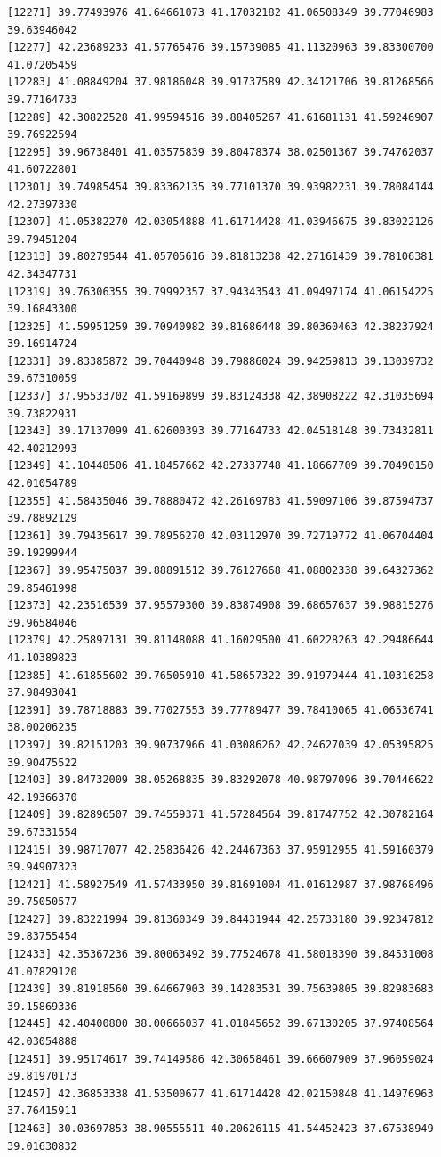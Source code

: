 \documentclass[
  letterpaper,
  DIV=11,
  numbers=noendperiod]{scrartcl}
\begin{document}
\begin{verbatim}
[12271] 39.77493976 41.64661073 41.17032182 41.06508349 39.77046983 39.63946042
[12277] 42.23689233 41.57765476 39.15739085 41.11320963 39.83300700 41.07205459
[12283] 41.08849204 37.98186048 39.91737589 42.34121706 39.81268566 39.77164733
[12289] 42.30822528 41.99594516 39.88405267 41.61681131 41.59246907 39.76922594
[12295] 39.96738401 41.03575839 39.80478374 38.02501367 39.74762037 41.60722801
[12301] 39.74985454 39.83362135 39.77101370 39.93982231 39.78084144 42.27397330
[12307] 41.05382270 42.03054888 41.61714428 41.03946675 39.83022126 39.79451204
[12313] 39.80279544 41.05705616 39.81813238 42.27161439 39.78106381 42.34347731
[12319] 39.76306355 39.79992357 37.94343543 41.09497174 41.06154225 39.16843300
[12325] 41.59951259 39.70940982 39.81686448 39.80360463 42.38237924 39.16914724
[12331] 39.83385872 39.70440948 39.79886024 39.94259813 39.13039732 39.67310059
[12337] 37.95533702 41.59169899 39.83124338 42.38908222 42.31035694 39.73822931
[12343] 39.17137099 41.62600393 39.77164733 42.04518148 39.73432811 42.40212993
[12349] 41.10448506 41.18457662 42.27337748 41.18667709 39.70490150 42.01054789
[12355] 41.58435046 39.78880472 42.26169783 41.59097106 39.87594737 39.78892129
[12361] 39.79435617 39.78956270 42.03112970 39.72719772 41.06704404 39.19299944
[12367] 39.95475037 39.88891512 39.76127668 41.08802338 39.64327362 39.85461998
[12373] 42.23516539 37.95579300 39.83874908 39.68657637 39.98815276 39.96584046
[12379] 42.25897131 39.81148088 41.16029500 41.60228263 42.29486644 41.10389823
[12385] 41.61855602 39.76505910 41.58657322 39.91979444 41.10316258 37.98493041
[12391] 39.78718883 39.77027553 39.77789477 39.78410065 41.06536741 38.00206235
[12397] 39.82151203 39.90737966 41.03086262 42.24627039 42.05395825 39.90475522
[12403] 39.84732009 38.05268835 39.83292078 40.98797096 39.70446622 42.19366370
[12409] 39.82896507 39.74559371 41.57284564 39.81747752 42.30782164 39.67331554
[12415] 39.98717077 42.25836426 42.24467363 37.95912955 41.59160379 39.94907323
[12421] 41.58927549 41.57433950 39.81691004 41.01612987 37.98768496 39.75050577
[12427] 39.83221994 39.81360349 39.84431944 42.25733180 39.92347812 39.83755454
[12433] 42.35367236 39.80063492 39.77524678 41.58018390 39.84531008 41.07829120
[12439] 39.81918560 39.64667903 39.14283531 39.75639805 39.82983683 39.15869336
[12445] 42.40400800 38.00666037 41.01845652 39.67130205 37.97408564 42.03054888
[12451] 39.95174617 39.74149586 42.30658461 39.66607909 37.96059024 39.81970173
[12457] 42.36853338 41.53500677 41.61714428 42.02150848 41.14976963 37.76415911
[12463] 30.03697853 38.90555511 40.20626115 41.54452423 37.67538949 39.01630832

\end{verbatim}
\end{document}

